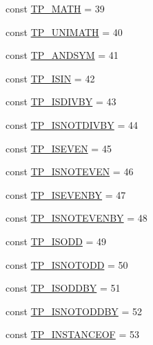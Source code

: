 \begin{DoxyCompactItemize}
\item 
const \hyperlink{class_smarty___internal___templateparser_a1425349819231499870ec60fb9c0c045}{T\+P\+\_\+\+M\+A\+T\+H} = 39
\item 
const \hyperlink{class_smarty___internal___templateparser_a151ec4fbd28ee751665f6e306d8da02d}{T\+P\+\_\+\+U\+N\+I\+M\+A\+T\+H} = 40
\item 
const \hyperlink{class_smarty___internal___templateparser_af4098ca55b120d8f40308d4c26294cdd}{T\+P\+\_\+\+A\+N\+D\+S\+Y\+M} = 41
\item 
const \hyperlink{class_smarty___internal___templateparser_aa3f0101d7eea6146dd3fa735fda03059}{T\+P\+\_\+\+I\+S\+I\+N} = 42
\item 
const \hyperlink{class_smarty___internal___templateparser_af0658ddfe0acebf9b6952bda2929e3dc}{T\+P\+\_\+\+I\+S\+D\+I\+V\+B\+Y} = 43
\item 
const \hyperlink{class_smarty___internal___templateparser_a3bfc0d74a761146fc613d1d7c0d6b93b}{T\+P\+\_\+\+I\+S\+N\+O\+T\+D\+I\+V\+B\+Y} = 44
\item 
const \hyperlink{class_smarty___internal___templateparser_a342389f3d553d911c8b62fcd5da8fe93}{T\+P\+\_\+\+I\+S\+E\+V\+E\+N} = 45
\item 
const \hyperlink{class_smarty___internal___templateparser_a6873dbff32d466d098d802f448663b0f}{T\+P\+\_\+\+I\+S\+N\+O\+T\+E\+V\+E\+N} = 46
\item 
const \hyperlink{class_smarty___internal___templateparser_a5e6729132bf8ee3854f41db26b2601b9}{T\+P\+\_\+\+I\+S\+E\+V\+E\+N\+B\+Y} = 47
\item 
const \hyperlink{class_smarty___internal___templateparser_a6d3dbcd0c062df7dbbe1b4a279af0224}{T\+P\+\_\+\+I\+S\+N\+O\+T\+E\+V\+E\+N\+B\+Y} = 48
\item 
const \hyperlink{class_smarty___internal___templateparser_a00edc1fc7278b8e69693dce5633dd8b6}{T\+P\+\_\+\+I\+S\+O\+D\+D} = 49
\item 
const \hyperlink{class_smarty___internal___templateparser_a9a9b54e85051e9affecf2d8d375362a5}{T\+P\+\_\+\+I\+S\+N\+O\+T\+O\+D\+D} = 50
\item 
const \hyperlink{class_smarty___internal___templateparser_ad6289fb26f115f006b246ea8df67be84}{T\+P\+\_\+\+I\+S\+O\+D\+D\+B\+Y} = 51
\item 
const \hyperlink{class_smarty___internal___templateparser_a9ee8924d2f48a70f4d394b87ddba621b}{T\+P\+\_\+\+I\+S\+N\+O\+T\+O\+D\+D\+B\+Y} = 52
\item 
const \hyperlink{class_smarty___internal___templateparser_a0f11f6f50d975c6db75439a183d27155}{T\+P\+\_\+\+I\+N\+S\+T\+A\+N\+C\+E\+O\+F} = 53

\end{DoxyCompactItemize}
